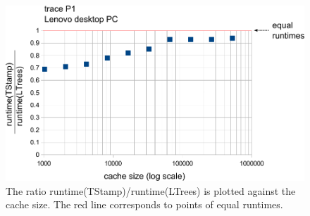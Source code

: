 \documentclass[a4paper,12pt, titlepage]{article}  %
\begin{document}
\begin{figure}[p]
	\centering
	\includegraphics[scale=0.8]{./experiments/lenovo_P1.pdf}
	\caption{The ratio runtime(TStamp)/runtime(LTrees) is plotted against the cache size.
                     The red line corresponds to points of equal runtimes.} 
	\label{fig:lenovo_P1}
\end{figure}
\end{document}
